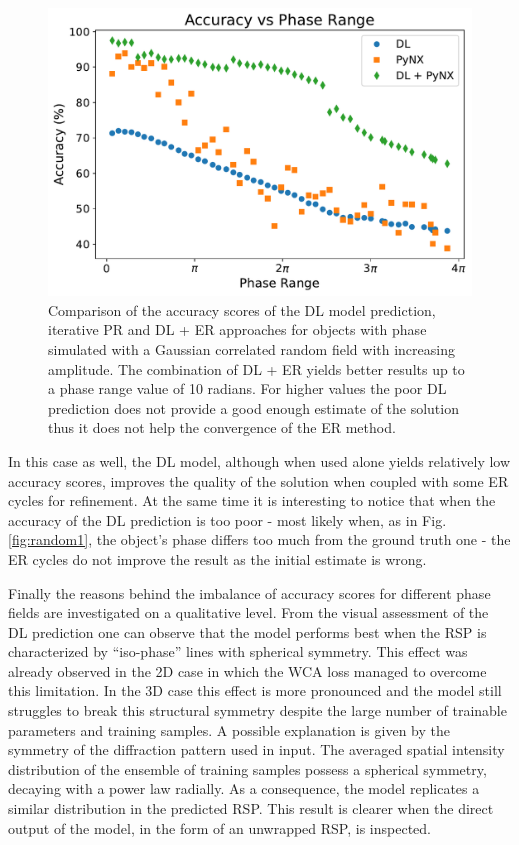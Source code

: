 \begin{figure}[H]
    \centering
    \includegraphics[width=\textwidth]{figures/Phasing/plot_acc_comparison_random_winter.pdf}
    \caption{Comparison of the accuracy scores of the DL model prediction, iterative PR and DL + ER approaches for objects with 
    phase simulated with a Gaussian correlated random field with increasing amplitude. The combination of DL + ER yields better 
    results up to a phase range value of 10 radians. For higher values the poor DL prediction does not provide a good enough 
    estimate of the solution thus it does not help the convergence of the ER method. }
    \label{fig:compare_random}
\end{figure}

In this case as well, the DL model, although when used alone yields relatively low accuracy scores, improves the quality of the 
solution when coupled with some ER cycles for refinement. At the same time it is interesting to notice that when the 
accuracy of the DL prediction is too poor - most likely when, as in Fig.\ref{fig:random1}, the object's phase differs too 
much from the ground truth one - the ER cycles do not improve the result as the initial estimate is wrong. 

Finally the reasons behind the imbalance of accuracy scores for different phase 
fields are investigated on a qualitative level. From the visual assessment of the DL prediction one can observe that 
the model performs best when the RSP is characterized by ``iso-phase'' lines with spherical symmetry. This effect was 
already observed in the 2D case in which the WCA loss managed to overcome this limitation. In the 3D case this effect is 
more pronounced and the model still struggles to break this structural symmetry despite the large number of trainable parameters 
and training samples. A possible explanation is given by the symmetry of the diffraction pattern used in input. The averaged 
spatial intensity distribution of the ensemble of training samples possess a spherical symmetry, decaying with a power 
law radially. As a consequence, the model replicates a similar distribution in the predicted RSP. This result is clearer 
when the direct output of the model, in the form of an unwrapped RSP, is inspected. 


